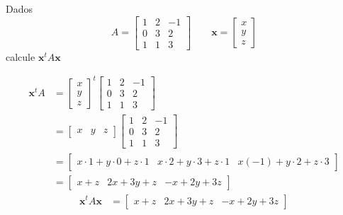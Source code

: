 \documentclass[a4paper,12pt,fleqn]{article}
\begin{document}

Dados
\[
  A =
  \begin{bmatrix}
    1 & 2 & -1 \\
    0 & 3 & 2  \\
    1 & 1 & 3
  \end{bmatrix}
\qquad
  \mathbf{x} =
  \begin{bmatrix}
    x \\ y \\ z
  \end{bmatrix}
\]
calcule \(\mathbf{x}^t A \mathbf{x}\)

\begin{answer}
  \begin{align*}
    \mathbf{x}^t A
    & =
    \begin{bmatrix}
      x \\ y \\ z
    \end{bmatrix}^t
    \begin{bmatrix}
      1 & 2 & -1 \\
      0 & 3 & 2  \\
      1 & 1 & 3
    \end{bmatrix}
    \\[2mm]
    & =
    \begin{bmatrix}
      x & y & z
    \end{bmatrix}
    \begin{bmatrix}
      1 & 2 & -1 \\
      0 & 3 & 2  \\
      1 & 1 & 3
    \end{bmatrix}
    \\[2mm]
    & =
    \begin{bmatrix}
      x \cdot 1 + y \cdot 0 + z \cdot 1 &
      x \cdot 2 + y \cdot 3 + z \cdot 1 &
      x(-1)     + y \cdot 2 + z \cdot 3
    \end{bmatrix}
    \\[2mm]
    & =
    \begin{bmatrix}
      x + z &
      2x + 3y + z &
      -x + 2y + 3z
    \end{bmatrix}
  \end{align*}
  \begin{align*}
    \mathbf{x}^t A \mathbf{x}
    & =
    \begin{bmatrix}
      x + z &
      2x + 3y + z &
      -x + 2y + 3z

\end{bmatrix}
\end{align*}
\end{answer}
\end{document}
